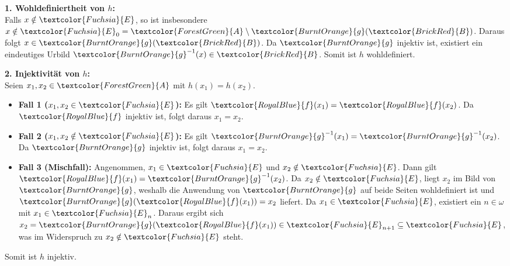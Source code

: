 \begin{math-stroke}
\begin{short-proof}
\textbf{1. Wohldefiniertheit von $h$:} \\
Falls $x \notin \textcolor{Fuchsia}{E}$, so ist insbesondere $x \notin \textcolor{Fuchsia}{E}_0 = \textcolor{ForestGreen}{A} \setminus \textcolor{BurntOrange}{g}(\textcolor{BrickRed}{B})$. Daraus folgt $x \in \textcolor{BurntOrange}{g}(\textcolor{BrickRed}{B})$. Da $\textcolor{BurntOrange}{g}$ injektiv ist, existiert ein eindeutiges Urbild $\textcolor{BurntOrange}{g}^{-1}(x) \in \textcolor{BrickRed}{B}$. Somit ist $h$ wohldefiniert.

\textbf{2. Injektivität von $h$:} \\
Seien $x_1, x_2 \in \textcolor{ForestGreen}{A}$ mit $h(x_1) = h(x_2)$.
\begin{itemize}
    \item \textbf{Fall 1 ($x_1, x_2 \in \textcolor{Fuchsia}{E}$):} Es gilt $\textcolor{RoyalBlue}{f}(x_1) = \textcolor{RoyalBlue}{f}(x_2)$. Da $\textcolor{RoyalBlue}{f}$ injektiv ist, folgt daraus $x_1 = x_2$.
    \item \textbf{Fall 2 ($x_1, x_2 \notin \textcolor{Fuchsia}{E}$):} Es gilt $\textcolor{BurntOrange}{g}^{-1}(x_1) = \textcolor{BurntOrange}{g}^{-1}(x_2)$. Da $\textcolor{BurntOrange}{g}$ injektiv ist, folgt daraus $x_1 = x_2$.
    \item \textbf{Fall 3 (Mischfall):} Angenommen, $x_1 \in \textcolor{Fuchsia}{E}$ und $x_2 \notin \textcolor{Fuchsia}{E}$. Dann gilt $\textcolor{RoyalBlue}{f}(x_1) = \textcolor{BurntOrange}{g}^{-1}(x_2)$. Da $x_2 \notin \textcolor{Fuchsia}{E}$, liegt $x_2$ im Bild von $\textcolor{BurntOrange}{g}$, weshalb die Anwendung von $\textcolor{BurntOrange}{g}$ auf beide Seiten wohldefiniert ist und $\textcolor{BurntOrange}{g}(\textcolor{RoyalBlue}{f}(x_1)) = x_2$ liefert. Da $x_1 \in \textcolor{Fuchsia}{E}$, existiert ein $n \in \omega$ mit $x_1 \in \textcolor{Fuchsia}{E}_n$. Daraus ergibt sich $x_2 = \textcolor{BurntOrange}{g}(\textcolor{RoyalBlue}{f}(x_1)) \in \textcolor{Fuchsia}{E}_{n+1} \subseteq \textcolor{Fuchsia}{E}$, was im Widerspruch zu $x_2 \notin \textcolor{Fuchsia}{E}$ steht.
\end{itemize}
Somit ist $h$ injektiv.


\end{short-proof}
\end{math-stroke}
